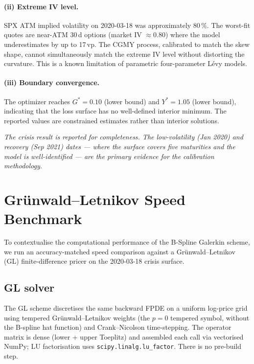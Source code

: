 \documentclass[11pt,a4paper]{article}
\begin{document}
\paragraph{(ii) Extreme IV level.}
SPX ATM implied volatility on 2020-03-18 was approximately 80\,\%.
The worst-fit quotes are near-ATM 30\,d options (market IV $\approx 0.80$)
where the model underestimates by up to 17\,vp.
The CGMY process, calibrated to match the skew shape, cannot simultaneously
match the extreme IV level without distorting the curvature.
This is a known limitation of parametric four-parameter Lévy models.

\paragraph{(iii) Boundary convergence.}
The optimizer reaches $G^* = 0.10$ (lower bound) and $Y^* = 1.05$ (lower
bound), indicating that the loss surface has no well-defined interior minimum.
The reported values are constrained estimates rather than interior solutions.

\medskip
\noindent\textit{%
The crisis result is reported for completeness.
The low-volatility (Jan 2020) and recovery (Sep 2021) dates — where the
surface covers five maturities and the model is well-identified — are the
primary evidence for the calibration methodology.}

\section{Grünwald–Letnikov Speed Benchmark}
\label{sec:gl_benchmark}

To contextualise the computational performance of the B-Spline Galerkin
scheme, we run an accuracy-matched speed comparison against a
Gr\"{u}nwald--Letnikov (GL) finite-difference pricer on the 2020-03-18
crisis surface.

\subsection{GL solver}

The GL scheme discretises the same backward FPDE on a uniform log-price
grid using tempered Gr\"{u}nwald--Letnikov weights (the $p=0$ tempered
symbol, without the B-spline hat function) and Crank--Nicolson time-stepping.
The operator matrix is dense (lower + upper Toeplitz) and assembled each call
via vectorised NumPy; LU factorisation uses \texttt{scipy.linalg.lu\_factor}.
There is no pre-build step.
\end{document}
